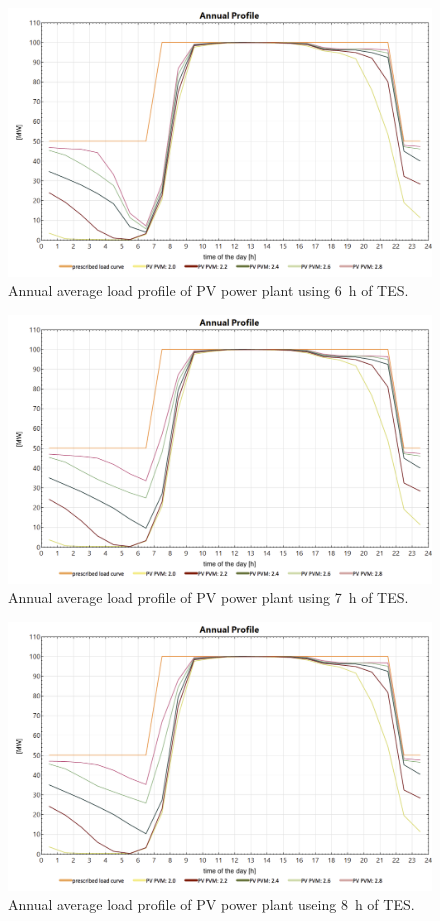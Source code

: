%
\begin{figure}[htbp]  
\centering
\includegraphics[width=0.8\linewidth]{FIG/Appendix_LCC/PV6h}
\caption[Annual average load profile of PV power plant using 6~h of TES.]{Annual average load profile of PV power plant using 6~h of TES.}\label{PV6h}
\end{figure}
%
\begin{figure}[htbp]  
\centering
\includegraphics[width=0.8\linewidth]{FIG/Appendix_LCC/PV7h}
\caption[Annual average load profile of PV power plant using 7~h of TES.]{Annual average load profile of PV power plant using 7~h of TES.}\label{PV7h}
\end{figure}
%
\begin{figure}[htbp]  
\centering
\includegraphics[width=0.8\linewidth]{FIG/Appendix_LCC/PV8h}
\caption[Annual average load profile of PV power plant useing 8~h of TES.]{Annual average load profile of PV power plant useing 8~h of TES.}\label{PV8h}
\end{figure}
%

\pagebreak
